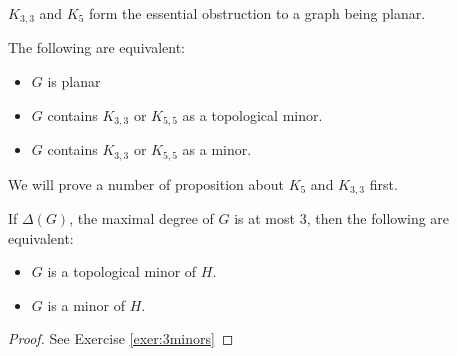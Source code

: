  $K_{3,3}$ and $K_5$ form the essential obstruction to a graph being planar. 
\begin{theorem}\label{thm:kuratowski}
 The following are equivalent:
 \begin{itemize}
  \item $G$ is planar
  \item $G$ contains $K_{3,3}$ or $K_{5,5}$ as a topological minor.
  \item $G$ contains $K_{3,3}$ or $K_{5,5}$ as a minor.
 \end{itemize}
\end{theorem}
We will prove a number of proposition about $K_5$ and $K_{3,3}$ first.
\begin{prop}
 If $\Delta(G)$, the maximal degree of $G$ is at most 3, then the following are equivalent:
 \begin{itemize}
  \item $G$ is a topological minor of $H$.
  \item $G$ is a minor of $H$. 
 \end{itemize}
\end{prop}
\begin{proof}
See Exercise \ref{exer:3minors}
\end{proof}

